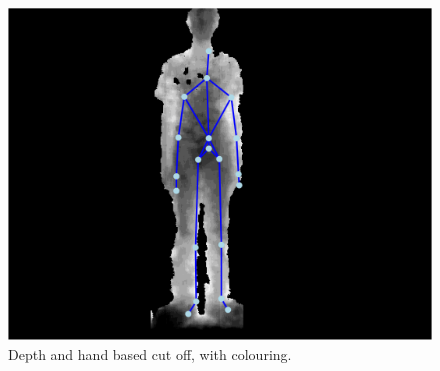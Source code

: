 \begin{figure}[h]
\begin{center}
\includegraphics[scale=0.4]{images/parse3} 
\end{center}
\caption{Depth and hand based cut off, with colouring.}
\label{fig:depth and hand based cut off}
\end{figure} 